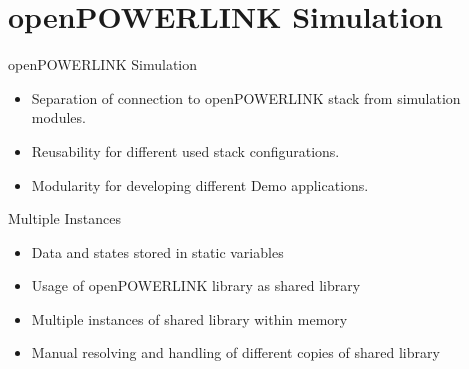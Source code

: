 \section{openPOWERLINK Simulation}
\begin{frame}{openPOWERLINK Simulation}
    \begin{itemize}
        \item Separation of connection to openPOWERLINK stack from simulation modules.
        \item Reusability for different used stack configurations.
        \item Modularity for developing different Demo applications.
    \end{itemize}

    \begin{block}{Multiple Instances}
        \begin{itemize}
            \item Data and states stored in static variables
            \item Usage of openPOWERLINK library as shared library
            \item Multiple instances of shared library within memory
            \item Manual resolving and handling of different copies of shared library
        \end{itemize}
    \end{block}
\end{frame}

